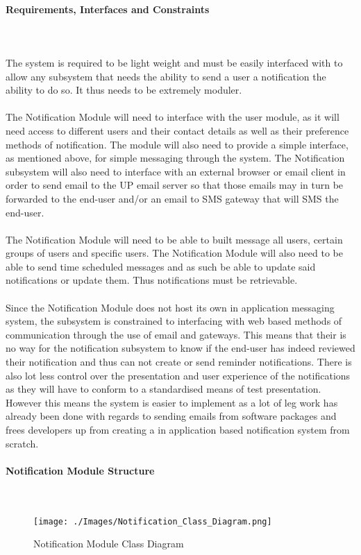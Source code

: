 \documentclass{article}
\begin{document}
			\paragraph	{Requirements, Interfaces and Constraints} \mbox{} \\\\
			{The system is required to be light weight and must be easily interfaced with to allow any subsystem that needs the ability to send a user a notification the ability to do so. It thus needs to be extremely moduler. \\ \\The Notification Module will need to interface with the user module, as it will need access to different users and their contact details as well as their preference methods of notification. The module will also need to provide a simple interface, as mentioned above, for simple messaging through the system. The Notification subsystem will also need to interface with an external browser or email client in order to send email to the UP email server so that those emails may in turn be forwarded to the end-user and/or an email to SMS gateway that will SMS the end-user.\\ \\The Notification Module will need to be able to built message all users, certain groups of users and specific users. The Notification Module will also need to be able to send time scheduled messages and as such be able to update said notifications or update them. Thus notifications must be retrievable.\\ \\Since the Notification Module does not host its own in application messaging system, the subsystem is constrained to interfacing with web based methods of communication through the use of email and gateways. This means that their is no way for the notification subsystem to know if the end-user has indeed reviewed their notification and thus can not create or send reminder notifications. There is also lot less control over the presentation and user experience of the notifications as they will have to conform to a standardised means of test presentation. However this means the system is easier to implement as a lot of leg work has already been done with regards to sending emails from software packages and frees developers up from creating a in application based notification system from scratch.}
		
			\newpage
			\paragraph	{Notification Module Structure} \mbox{} \\
			\begin{figure}[h]
				\texttt{[image: ./Images/Notification\_Class\_Diagram.png]} 
				\caption{Notification Module Class Diagram}
			\end{figure}
			
\end{document}

